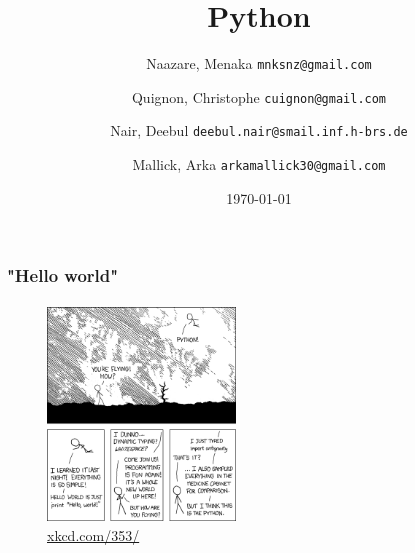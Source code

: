 \documentclass{beamer}
\begin{document}
\title{Python}
\subtitle{}
\author{
  Naazare, Menaka \texttt{mnksnz@gmail.com}  \\ \and
  Quignon, Christophe \texttt{cuignon@gmail.com}\\ \and
  Nair, Deebul \texttt{deebul.nair@smail.inf.h-brs.de} \\ \and
  Mallick, Arka \texttt{arkamallick30@gmail.com} \\ \and
} 
\date{\today}

\begin{frame}
\titlepage
\end{frame}





\begin{frame}
\frametitle{"Hello world"}
\framesubtitle{}
 
 \begin{figure}
 \center
 \includegraphics[width=5cm]{images/python.png}
 \caption{\href{http://xkcd.com/353/}{xkcd.com/353/}}
\end{figure}
 
\end{frame}
\end{document}
